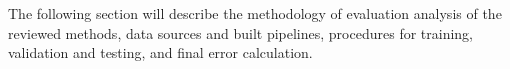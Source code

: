 %
The following section will describe the methodology of evaluation analysis of the reviewed methods, data sources and built pipelines, procedures for training, validation and testing, and final error calculation.

